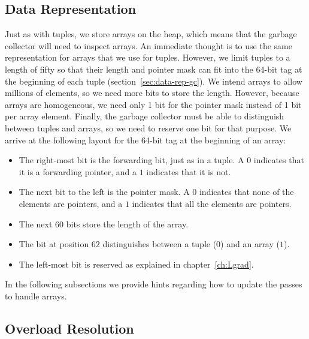 \documentclass[7x10]{TimesAPriori_MIT}%
\numberwithin{theorem}{chapter}
\numberwithin{definition}{chapter}
\numberwithin{equation}{chapter}
\begin{document}
\subsection{Data Representation}
\label{sec:array-rep}

Just as with tuples, we store arrays on the heap, which means that the
garbage collector will need to inspect arrays. An immediate thought is
to use the same representation for arrays that we use for tuples.
However, we limit tuples to a length of fifty so that their length and
pointer mask can fit into the 64-bit tag at the beginning of each
tuple (section~\ref{sec:data-rep-gc}). We intend arrays to allow
millions of elements, so we need more bits to store the length.
However, because arrays are homogeneous, we need only 1 bit for the
pointer mask instead of 1 bit per array element.  Finally, the
garbage collector must be able to distinguish between tuples
and arrays, so we need to reserve one bit for that purpose.  We
arrive at the following layout for the 64-bit tag at the beginning of
an array:
\begin{itemize}
\item The right-most bit is the forwarding bit, just as in a tuple.
  A $0$ indicates that it is a forwarding pointer, and a $1$ indicates
  that it is not.
  
\item The next bit to the left is the pointer mask. A $0$ indicates
  that none of the elements are pointers, and a $1$ indicates that all
  the elements are pointers.

\item The next $60$ bits store the length of the array.

\item The bit at position $62$ distinguishes between a tuple ($0$)
  and an array ($1$).

\item The left-most bit is reserved as explained in
  chapter~\ref{ch:Lgrad}.
\end{itemize}



In the following subsections we provide hints regarding how to update
the passes to handle arrays.


\subsection{Overload Resolution}
\label{sec:array-resolution}
\end{document}
